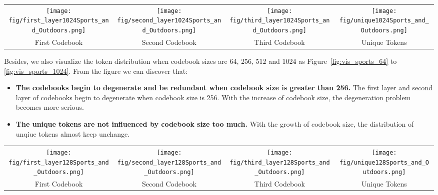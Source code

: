 \begin{figure*}[htb!]
		\centering
		\begin{tabular}{cccc}
\texttt{[image: fig/first\_layer1024Sports\_and\_Outdoors.png]} &
       \texttt{[image: fig/second\_layer1024Sports\_and\_Outdoors.png]}  & \texttt{[image: fig/third\_layer1024Sports\_and\_Outdoors.png]}  &
       \texttt{[image: fig/unique1024Sports\_and\_Outdoors.png]}
	     \\ First Codebook & Second Codebook & Third Codebook & Unique Tokens
		\end{tabular}
	\caption{Almost all codebooks degenerate on Sports dataset with codebook size 1024. In particular, the first and second codebooks degenerate extremely.}	\label{fig:vis_sports_1024}
\end{figure*} 

Besides, we also visualize the token distribution when codebook sizes are 64, 256, 512 and 1024 as Figure~\ref{fig:vis_sports_64} to \ref{fig:vis_sports_1024}. From the figure we can discover that:
\begin{itemize}[leftmargin=*]
\item \textbf{The codebooks begin to degenerate and be redundant when codebook size is greater than 256.} The first layer and second layer of codebooks begin to degenerate when codebook size is 256. With the increase of codebook size, the degeneration problem becomes more serious.
\item \textbf{The unique tokens are not influenced by codebook size too much.} With the growth of codebook size, the distribution of unqiue tokens almost keep unchange.

\end{itemize}

\begin{figure*}[htb!]
		\centering
		\begin{tabular}{cccc}
\texttt{[image: fig/first\_layer128Sports\_and\_Outdoors.png]} &
       \texttt{[image: fig/second\_layer128Sports\_and\_Outdoors.png]}  & \texttt{[image: fig/third\_layer128Sports\_and\_Outdoors.png]}  &
       \texttt{[image: fig/unique128Sports\_and\_Outdoors.png]}
	     \\ First Codebook & Second Codebook & Third Codebook & Unique Tokens
      \end{tabular}
	\caption{The patterns of codebooks are various across different layers and unique tokens are uniform for different items on Sports dataset.}	\label{fig:vis_sport}
\end{figure*} 

